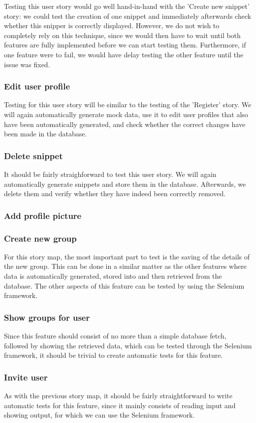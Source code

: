 \documentclass {article}
\begin{document}
Testing this user story would go well hand-in-hand with the 'Create new snippet' story: we could test the creation of one snippet and immediately afterwards check whether this snipper is correctly displayed.
However, we do not wish to completely rely on this technique, since we would then have to wait until both features are fully implemented before we can start testing them. Furthermore, if one feature were to fail, we would have delay testing the other feature until the issue was fixed.

\subsubsection*{Edit user profile}
Testing for this user story will be similar to the testing of the 'Register' story. We will again automatically generate mock data, use it to edit user profiles that also have been automatically generated, and check whether the correct changes have been made in the database.

\subsubsection*{Delete snippet}
It should be fairly straighforward to test this user story. We will again automatically generate snippets and store them in the database. Afterwards, we delete them and verify whether they have indeed been correctly removed.

\subsubsection*{Add profile picture}

\subsubsection*{Create new group}
For this story map, the most important part to test is the saving of the details of the new group. This can be done in a similar matter as the other features where data is automatically generated, stored into and then retrieved from the database.
The other aspects of this feature can be tested by using the Selenium framework.

\subsubsection*{Show groups for user}
Since this feature should consist of no more than a simple database fetch, followed by showing the retrieved data, which can be tested through the Selenium framework, it should be trivial to create automatic tests for this feature.

\subsubsection*{Invite user}
As with the previous story map, it should be fairly straightforward to write automatic tests for this feature, since it mainly consists of reading input and showing output, for which we can use the Selenium framework.
\end{document}
